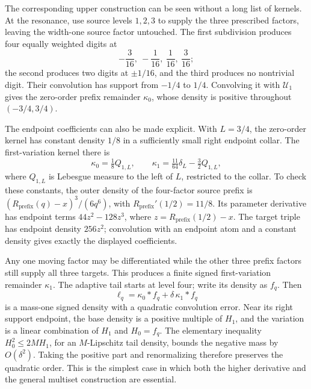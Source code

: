 \documentclass[11pt,letterpaper]{article}
\theoremstyle{definition}
\theoremstyle{remark}
\newcommand{\Un}{\mathcal U}
\begin{document}
The corresponding upper construction can be seen without a long list of kernels. At the resonance, use source levels $1,2,3$ to supply the three prescribed factors, leaving the width-one source factor untouched. The first subdivision produces four equally weighted digits at
\[
 -\frac{3}{16},\ -\frac1{16},\ \frac1{16},\ \frac3{16};
\]
the second produces two digits at $\pm1/16$, and the third produces no nontrivial digit. Their convolution has support from $-1/4$ to $1/4$. Convolving it with $\Un_1$ gives the zero-order prefix remainder $\kappa_0$, whose density is positive throughout $(-3/4,3/4)$.

The endpoint coefficients can also be made explicit. With $L=3/4$, the zero-order kernel has constant density $1/8$ in a sufficiently small right endpoint collar. The first-variation kernel there is
\[
 \kappa_0=\tfrac18 Q_{1,L},\qquad
 \kappa_1=\tfrac{11}{64}\delta_L-\tfrac32 Q_{1,L},
\]
where $Q_{1,L}$ is Lebesgue measure to the left of $L$, restricted to the collar. To check these constants, the outer density of the four-factor source prefix is
$(R_{\mathrm{prefix}}(q)-x)^3/(6q^6)$, with
$R_{\mathrm{prefix}}'(1/2)=11/8$. Its parameter derivative has endpoint terms $44z^2-128z^3$, where $z=R_{\mathrm{prefix}}(1/2)-x$. The target triple has endpoint density $256z^2$; convolution with an endpoint atom and a constant density gives exactly the displayed coefficients.

Any one moving factor may be differentiated while the other three prefix factors still supply all three targets. This produces a finite signed first-variation remainder $\kappa_1$. The adaptive tail starts at level four; write its density as $f_q$. Then
\[
 \ell_q=\kappa_0*f_q+\delta\,\kappa_1*f_q
\]
is a mass-one signed density with a quadratic convolution error. Near its right support endpoint, the base density is a positive multiple of $H_1$, and the variation is a linear combination of $H_1$ and $H_0=f_q$. The elementary inequality $H_0^2\le2M H_1$, for an $M$-Lipschitz tail density, bounds the negative mass by $O(\delta^2)$. Taking the positive part and renormalizing therefore preserves the quadratic order. This is the simplest case in which both the higher derivative and the general multiset construction are essential.
\end{document}
